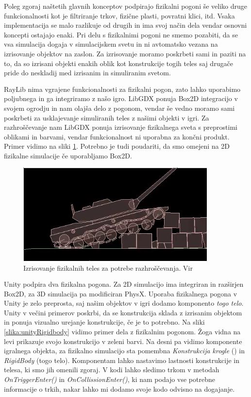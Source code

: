 \documentclass[12pt,a4paper,twoside]{book}
\begin{document}
Poleg zgoraj naštetih glavnih konceptov podpirajo fizikalni pogoni še veliko druge funkcionalnosti kot je filtriranje trkov, fizične plasti, povratni klici, itd. Vsaka implementacija se malo razlikuje od drugih in ima svoj način dela vendar osnovni koncepti ostajajo enaki. Pri delu s fizikalnimi pogoni ne smemo pozabiti, da se vsa simulacija dogaja v simulacijskem svetu in ni avtomatsko vezana na izrisovanje objektov na zaslon. Za izrisovanje moramo poskrbeti sami in paziti na to, da so izrisani objekti enakih oblik kot konstrukcije togih teles saj drugače pride do neskladij med izrisanim in simuliranim svetom.

RayLib nima vgrajene funkcionalnosti za fizikalni pogon, zato lahko uporabimo poljubnega in ga integriramo z našo igro. LibGDX ponuja Box2D integracijo v svojem ogrodju in nam olajša delo z pogonom, vendar še vedno moramo sami poskrbeti za usklajevanje simuliranih teles z našimi objekti v igri. Za razhroščevanje nam LibGDX ponuja izrisovanje fizikalnega sveta s preprostimi oblikami in barvami, vendar funkcionalnost ni uporabna za končni produkt. Primer vidimo na sliki \ref{slika:box2dDebug}. Potrebno je tudi poudariti, da smo omejeni na 2D fizikalne simulacije če uporabljamo Box2D.

\begin{figure}[h]
	\centering
	\includegraphics[width=10cm]{box2dDebug}
	\caption{Izrisovanje fizikalnih teles za potrebe razhroščevanja. Vir \cite{box2dTank}}
	\label{slika:box2dDebug}
\end{figure}

Unity podpira dva fizikalna pogona. Za 2D simulacijo ima integriran in razširjen Box2D, za 3D simulacija pa modificiran PhysX. Uporaba fizikalnega pogona v Unity je zelo preprosta, saj našim objektov v igri dodamo komponento \textit{togo telo}. Unity v večini primerov poskrbi, da se konstrukcija sklada z izrisanim objektom in ponuja vizualno urejanje konstrukcije, če je to potrebno. Na sliki \ref{slika:unityRigidbody} vidimo primer dela z fizikalnim pogonom. Žoga vidna na levi prikazuje svojo konstrukcijo v zeleni barvi. Na desni pa vidimo komponente igralnega objekta, za fizikalno simulacijo sta pomembna \textit{Konstrukcija krogle} () in \textit{RigidBody} (togo telo). Komponentam lahko nastavimo lastnosti konstrukcije in telesa, ki smo jih omenili zgoraj. V kodi lahko sledimo trkom v metodah \textit{OnTriggerEnter()} in \textit{OnCollissionEnter()}, ki nam podajo vse potrebne informacije o trkih, nakar lahko mi dodamo svoje kodo odvisno na dogajanje.
\end{document}
